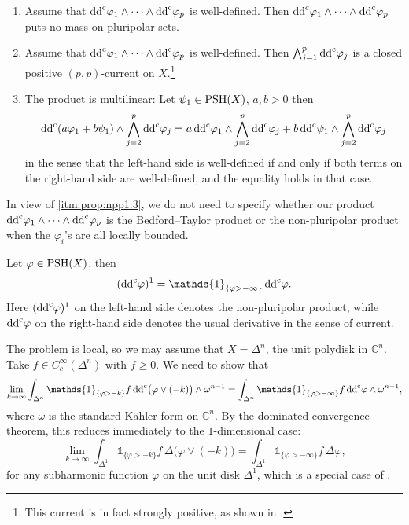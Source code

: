 \begin{proposition}
\begin{enumerate}
    \item\label{itm:prop:npp1:4} Assume that $\mathrm{dd}^{\mathrm{c}} \varphi_1\wedge\cdots\wedge \mathrm{dd}^{\mathrm{c}} \varphi_p$ is well-defined. Then $\mathrm{dd}^{\mathrm{c}} \varphi_1\wedge\cdots\wedge \mathrm{dd}^{\mathrm{c}} \varphi_p$ puts no mass on pluripolar sets.
    \item\label{itm:prop:npp1:5} Assume that $\mathrm{dd}^{\mathrm{c}} \varphi_1\wedge\cdots\wedge \mathrm{dd}^{\mathrm{c}} \varphi_p$ is well-defined. Then $\bigwedge_{j=1}^p \mathrm{dd}^{\mathrm{c}} \varphi_j$ is a closed positive $(p,p)$-current on $X$.\footnote{This current is in fact strongly positive, as shown in \cite{Xiabdiv2}.}
    \item\label{itm:prop:npp1:6} The product is multilinear: Let $\psi_1\in \mathrm{PSH}(X)$, $a,b>0$ then
\begin{equation}\label{eq:ppp6}
\mathrm{dd}^{\mathrm{c}} (a\varphi_1+b\psi_1)\wedge \bigwedge_{j=2}^p \mathrm{dd}^{\mathrm{c}} \varphi_j =a\,\mathrm{dd}^{\mathrm{c}} \varphi_1\wedge \bigwedge_{j=2}^p \mathrm{dd}^{\mathrm{c}} \varphi_j + b\,\mathrm{dd}^{\mathrm{c}} \psi_1\wedge \bigwedge_{j=2}^p \mathrm{dd}^{\mathrm{c}} \varphi_j
\end{equation}
in the sense that the left-hand side is well-defined if and only if both terms on the right-hand side are well-defined, and the equality holds in that case.
\end{enumerate}
\end{proposition}
In view of \ref{itm:prop:npp1:3}, we do not need to specify whether our product $\mathrm{dd}^{\mathrm{c}} \varphi_1\wedge\cdots\wedge \mathrm{dd}^{\mathrm{c}} \varphi_p$ is the Bedford--Taylor product or the non-pluripolar product when the $\varphi_i$'s are all locally bounded.

\begin{example}\label{ex:1Dnpp}
    Let $\varphi\in \mathrm{PSH}(X)$, then
    \begin{equation}\label{eq:1dimnpp}
        (\ddc \varphi)^1=\mathds{1}_{\{\varphi>-\infty\}}\,\ddc\varphi.
    \end{equation}
    Here $(\mathrm{dd}^{\mathrm{c}} \varphi)^1$ on the left-hand side denotes the non-pluripolar product, while $\mathrm{dd}^{\mathrm{c}}\varphi$ on the right-hand side denotes the usual derivative in the sense of current.

    The problem is local, so we may assume that $X=\Delta^n$, the unit polydisk in $\mathbb{C}^n$. Take $f\in C^{\infty}_c(\Delta^n)$ with $f\geq 0$. We need to show that
    \[
        \lim_{k\to\infty} \int_{\Delta^n} \mathds{1}_{\{\varphi>-k\}}f\, \ddc \bigl(\varphi\lor (-k)\bigr)\wedge \omega^{n-1}=\int_{\Delta^n} \mathds{1}_{\{\varphi>-\infty\}}f\,\ddc\varphi\wedge \omega^{n-1},
    \]
    where $\omega$ is the standard Kähler form on $\mathbb{C}^n$. By the dominated convergence theorem, this reduces immediately to the $1$-dimensional case:
    \[
        \lim_{k\to\infty} \int_{\Delta^1} \mathds{1}_{\{\varphi>-k\}}f\, \Delta \bigl(\varphi\lor (-k)\bigr)=\int_{\Delta^1} \mathds{1}_{\{\varphi>-\infty\}}f\,\Delta\varphi,
    \]
    for any subharmonic function $\varphi$ on the unit disk $\Delta^1$, which is a special case of \cite[Proposition~3.3]{EK24}.
\end{example}

